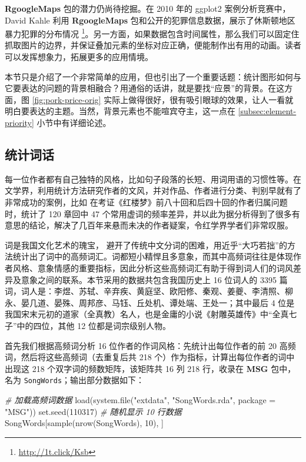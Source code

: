 \documentclass[
  b5paper,
  UTF8,twoside]{book}
\newenvironment{Shaded}{\begin{snugshade}}{\end{snugshade}}
\newcommand{\AttributeTok}[1]{\textcolor[rgb]{0.77,0.63,0.00}{#1}}
\newcommand{\CommentTok}[1]{\textcolor[rgb]{0.56,0.35,0.01}{\textit{#1}}}
\newcommand{\DecValTok}[1]{\textcolor[rgb]{0.00,0.00,0.81}{#1}}
\newcommand{\FunctionTok}[1]{\textcolor[rgb]{0.00,0.00,0.00}{#1}}
\newcommand{\NormalTok}[1]{#1}
\newcommand{\StringTok}[1]{\textcolor[rgb]{0.31,0.60,0.02}{#1}}
\begin{document}
\textbf{RgoogleMaps} 包的潜力仍尚待挖掘。在 2010 年的 ggplot2 案例分析竞赛中，David Kahle 利用 \textbf{RgoogleMaps} 包和公开的犯罪信息数据，展示了休斯顿地区暴力犯罪的分布情况 \footnote{\url{http://1t.click/Ksb}}。另一方面，如果数据包含时间属性，那么我们可以固定住抓取图片的边界，并保证叠加元素的坐标对应正确，便能制作出有用的动画。读者可以发挥想象力，拓展更多的应用情境。

本节只是介绍了一个非常简单的应用，但也引出了一个重要话题：统计图形如何与它要表达的问题的背景相融合？用通俗的话讲，就是要找``应景''的背景。在这方面，图 \ref{fig:pork-price-orig} 实际上做得很好，很有吸引眼球的效果，让人一看就明白要表达的主题。当然，背景元素也不能喧宾夺主，这一点在 \ref{subsec:element-priority} 小节中有详细论述。

\hypertarget{subsec:cluster}{%
\subsection{统计词话}\label{subsec:cluster}}

每一位作者都有自己独特的风格，比如句子段落的长短、用词用语的习惯性等。在文学界，利用统计方法研究作者的文风，并对作品、作者进行分类、判别早就有了非常成功的案例，比如 \citet{Li87} 在考证《红楼梦》前八十回和后四十回的作者归属问题时，统计了 120 章回中 47 个常用虚词的频率差异，并以此为据分析得到了很多有意思的结论，解决了几百年来悬而未决的作者疑案，令红学界学者们非常叹服。

词是我国文化艺术的瑰宝， \citet{Qiu11} 避开了传统中文分词的困难，用近乎``大巧若拙''的方法统计出了词中的高频词汇。词都短小精悍且多意象，而其中高频词往往是体现作者风格、意象情感的重要指标，因此分析这些高频词汇有助于得到词人们的词风差异及意象之间的联系。本节采用的数据共包含我国历史上 16 位词人的 3395 篇词，词人是：李煜、苏轼、辛弃疾、黄庭坚、欧阳修、秦观、姜夔、李清照、柳永、晏几道、晏殊、周邦彦、马钰、丘处机、谭处端、王处一；其中最后 4 位是我国宋末元初的道家（全真教）名人，也是金庸的小说《射雕英雄传》中``全真七子''中的四位，其他 12 位都是词宗级别人物。

首先我们根据高频词分析 16 位作者的作词风格：先统计出每位作者的前 20 高频词，然后将这些高频词（去重复后共 218 个）作为指标，计算出每位作者的词中出现这 218 个双字词的频数矩阵，该矩阵共 16 列 218 行，收录在 \textbf{MSG} 包中，名为 \texttt{SongWords}；输出部分数据如下：

\begin{Shaded}
\begin{Highlighting}[]
\CommentTok{\# 加载高频词数据}
\FunctionTok{load}\NormalTok{(}\FunctionTok{system.file}\NormalTok{(}\StringTok{"extdata"}\NormalTok{, }\StringTok{"SongWords.rda"}\NormalTok{, }\AttributeTok{package =} \StringTok{"MSG"}\NormalTok{))}
\FunctionTok{set.seed}\NormalTok{(}\DecValTok{110317}\NormalTok{) }\CommentTok{\# 随机显示 10 行数据}
\NormalTok{SongWords[}\FunctionTok{sample}\NormalTok{(}\FunctionTok{nrow}\NormalTok{(SongWords), }\DecValTok{10}\NormalTok{), ]}
\end{Highlighting}
\end{Shaded}
\end{document}
